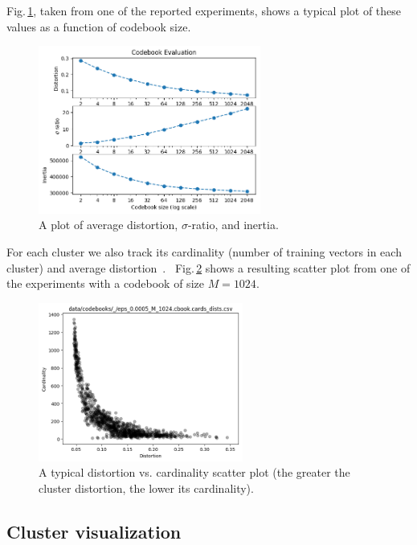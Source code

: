 \documentclass[letterpaper,12pt]{article}
\begin{document}
    Fig.\,\ref{fig:cb_evaluation}, taken from one of the reported experiments,
    shows a typical plot of these values as a function of codebook size.
    \begin{figure}[!ht]
        \centering
        \includegraphics[width=0.65\textwidth]{../6_good_songs/cb_evaluation.png}
        \caption{
        A plot of average distortion, $\sigma$-ratio, and inertia.
        }
        \label{fig:cb_evaluation}
    \end{figure}

    For each cluster we also track its cardinality
    (number of training vectors in each cluster)
    and average distortion~\citep{Rabiner:Levinson:Sondhi:1983}.
    \
    Fig.\,\ref{fig:cb_cards_dists_scatter} shows a resulting scatter plot
    from one of the experiments with a codebook of size $M=1024$.
    \begin{figure}[!ht]
        \centering
        \includegraphics[width=0.6\textwidth]{../6_good_songs/cb_cards_dists_scatter.png}
        \caption{
        A typical distortion vs. cardinality scatter plot
        (the greater the cluster distortion, the lower its cardinality).
        }
        \label{fig:cb_cards_dists_scatter}
    \end{figure}

    \subsection*{Cluster visualization}
\end{document}

